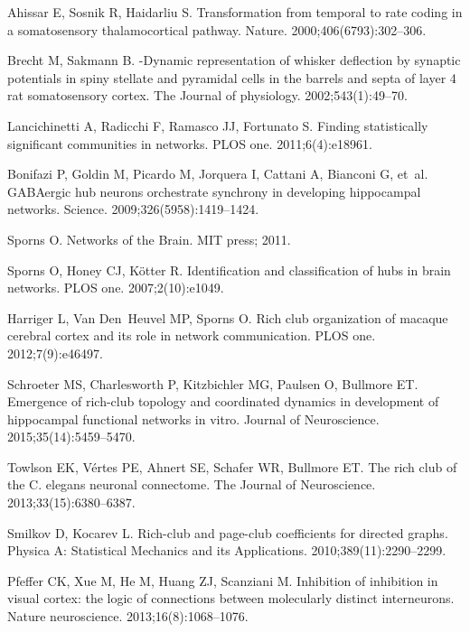 \documentclass[10pt,letterpaper]{article}
\begin{document}
\begin{thebibliography}{10}
Ahissar E, Sosnik R, Haidarliu S.
\newblock Transformation from temporal to rate coding in a somatosensory
  thalamocortical pathway.
\newblock Nature. 2000;406(6793):302--306.

Brecht M, Sakmann B.
\newblock -Dynamic representation of whisker deflection by synaptic potentials
  in spiny stellate and pyramidal cells in the barrels and septa of layer 4 rat
  somatosensory cortex.
\newblock The Journal of physiology. 2002;543(1):49--70.

Lancichinetti A, Radicchi F, Ramasco JJ, Fortunato S.
\newblock Finding statistically significant communities in networks.
\newblock PLOS one. 2011;6(4):e18961.

Bonifazi P, Goldin M, Picardo M, Jorquera I, Cattani A, Bianconi G, et~al.
\newblock GABAergic hub neurons orchestrate synchrony in developing hippocampal
  networks.
\newblock Science. 2009;326(5958):1419--1424.

Sporns O.
\newblock Networks of the Brain.
\newblock MIT press; 2011.

Sporns O, Honey CJ, K{\"o}tter R.
\newblock Identification and classification of hubs in brain networks.
\newblock PLOS one. 2007;2(10):e1049.

Harriger L, Van Den~Heuvel MP, Sporns O.
\newblock Rich club organization of macaque cerebral cortex and its role in
  network communication.
\newblock PLOS one. 2012;7(9):e46497.

Schroeter MS, Charlesworth P, Kitzbichler MG, Paulsen O, Bullmore ET.
\newblock Emergence of rich-club topology and coordinated dynamics in
  development of hippocampal functional networks in vitro.
\newblock Journal of Neuroscience. 2015;35(14):5459--5470.

Towlson EK, V{\'e}rtes PE, Ahnert SE, Schafer WR, Bullmore ET.
\newblock The rich club of the C. elegans neuronal connectome.
\newblock The Journal of Neuroscience. 2013;33(15):6380--6387.

Smilkov D, Kocarev L.
\newblock Rich-club and page-club coefficients for directed graphs.
\newblock Physica A: Statistical Mechanics and its Applications.
  2010;389(11):2290--2299.

Pfeffer CK, Xue M, He M, Huang ZJ, Scanziani M.
\newblock Inhibition of inhibition in visual cortex: the logic of connections
  between molecularly distinct interneurons.
\newblock Nature neuroscience. 2013;16(8):1068--1076.


\end{thebibliography}
\end{document}
